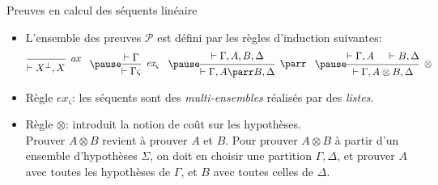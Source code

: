 \documentclass{beamer}
\newcommand*{\orth}{^\perp}
\newcommand*{\tensor}{\otimes}
\newcommand*{\hypv}[1]{\hypo{\vdash #1}}
\newcommand*{\axv}[1]{\infer{0}[\ensuremath{\mathit{ax}}]{\vdash #1}}
\newcommand*{\tensorv}[1]{\infer{2}[\ensuremath{\tensor}]{\vdash #1}}
\newcommand*{\parrv}[1]{\infer{1}[\ensuremath{\parr}]{\vdash #1}}
\newcommand*{\permv}[2]{\infer{1}[\ensuremath{\textit{ex}_{#1}}]{\vdash #2}}
\newcommand*{\permapp}[2]{#2 #1}
\newcommand*{\someperm}{\varsigma}
\newcommand*{\sequent}{\Gamma}
\newcommand*{\sequentbis}{\Delta}
\newcommand*{\proofs}{\ensuremath{\mathcal{P}}}
\begin{document}
\begin{frame}{Preuves en calcul des séquents linéaire}
    \begin{itemize}
        \item L'ensemble des preuves \proofs{} est défini par les règles d'induction suivantes:\pause
            \begin{equation*}
            \begin{prooftree}
              \axv{X\orth, X}
            \end{prooftree}
            \; \; \; \pause
            \begin{prooftree}
              \hypv{\sequent}
              \permv{\someperm}{\permapp{\someperm}{\sequent}}
            \end{prooftree}
            \; \; \; \pause
            \begin{prooftree}
              \hypv{\sequent, A, B, \sequentbis}
              \parrv{\sequent, A \parr B, \sequentbis}
            \end{prooftree}
            \; \; \; \pause
            \begin{prooftree}
              \hypv{\sequent, A}
              \hypv{B, \sequentbis}
              \tensorv{\sequent, A \tensor B, \sequentbis}
            \end{prooftree}
            \end{equation*}
            \pause
        \item Règle $\textit{ex}_{\someperm}$: \pause les séquents sont des \textit{multi-ensembles} réalisés par des \textit{listes}.
            \pause
        \item Règle $\tensor$: \pause introduit la notion de coût sur les hypothèses.\\
        \pause Prouver $A \tensor B$ revient à prouver $A$ et $B$. Pour prouver $A \tensor B$ à partir d'un ensemble d'hypothèses $\Sigma$, on doit en choisir une partition $\sequent, \sequentbis$, et prouver $A$ avec toutes les hypothèses de $\sequent$, et $B$ avec toutes celles de $\sequentbis$.
    \end{itemize}
\end{frame}
\end{document}

